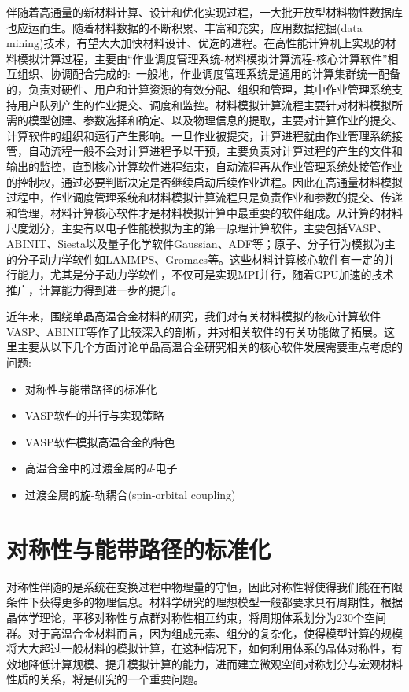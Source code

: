 伴随着高通量的新材料计算、设计和优化实现过程，一大批开放型材料物性数据库也应运而生。随着材料数据的不断积累、丰富和充实，应用数据挖掘(\textrm{data mining})技术，有望大大加快材料设计、优选的进程。在高性能计算机上实现的材料模拟计算过程，主要由“作业调度管理系统-材料模拟计算流程-核心计算软件”相互组织、协调配合完成的:~一般地，作业调度管理系统是通用的计算集群统一配备的，负责对硬件、用户和计算资源的有效分配、组织和管理，其中作业管理系统支持用户队列产生的作业提交、调度和监控。材料模拟计算流程主要针对材料模拟所需的模型创建、参数选择和确定、以及物理信息的提取，主要对计算作业的提交、计算软件的组织和运行产生影响。一旦作业被提交，计算进程就由作业管理系统接管，自动流程一般不会对计算进程予以干预，主要负责对计算过程的产生的文件和输出的监控，直到核心计算软件进程结束，自动流程再从作业管理系统处接管作业的控制权，通过必要判断决定是否继续启动后续作业进程。因此在高通量材料模拟过程中，作业调度管理系统和材料模拟计算流程只是负责作业和参数的提交、传递和管理，材料计算核心软件才是材料模拟计算中最重要的软件组成。从计算的材料尺度划分，主要有以电子性能模拟为主的第一原理计算软件，主要包括\textrm{VASP}、\textrm{ABINIT}、\textrm{Siesta}以及量子化学软件\textrm{Gaussian}、\textrm{ADF}等；原子、分子行为模拟为主的分子动力学软件如\textrm{LAMMPS}、\textrm{Gromacs}等。这些材料计算核心软件有一定的并行能力，尤其是分子动力学软件，不仅可是实现\textrm{MPI}并行，随着\textrm{GPU}加速的技术推广，计算能力得到进一步的提升。

近年来，围绕单晶高温合金材料的研究，我们对有关材料模拟的核心计算软件\textrm{VASP}、\textrm{ABINIT}等作了比较深入的剖析，并对相关软件的有关功能做了拓展。这里主要从以下几个方面讨论单晶高温合金研究相关的核心软件发展需要重点考虑的问题:~
\begin{itemize}
	\item 对称性与能带路径的标准化
	\item \textrm{VASP}软件的并行与实现策略
	\item \textrm{VASP}软件模拟高温合金的特色
	\item 高温合金中的过渡金属的\textit{d}-电子
	\item 过渡金属的旋-轨耦合\textrm{(spin-orbital coupling)}
\end{itemize}

\section{对称性与能带路径的标准化}
对称性伴随的是系统在变换过程中物理量的守恒，因此对称性将使得我们能在有限条件下获得更多的物理信息。材料学研究的理想模型一般都要求具有周期性，根据晶体学理论，平移对称性与点群对称性相互约束，将周期体系划分为230个空间群。对于高温合金材料而言，因为组成元素、组分的复杂化，使得模型计算的规模将大大超过一般材料的模拟计算，在这种情况下，如何利用体系的晶体对称性，有效地降低计算规模、提升模拟计算的能力，进而建立微观空间对称划分与宏观材料性质的关系，将是研究的一个重要问题。


